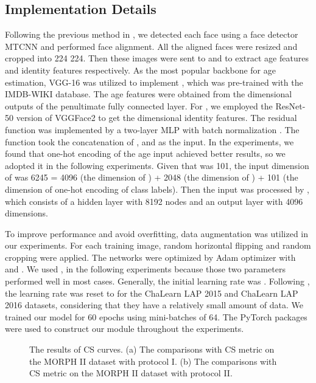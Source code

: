 \documentclass[journal,twoside]{IEEEtran}
\begin{document}
\subsection{Implementation Details}
Following the previous method in \cite{li2019bridgenet}, we detected each face using a face detector MTCNN \cite{zhang2016joint} and performed face alignment.  All the aligned faces were resized and cropped into 224  224. Then these images were sent to  and  to extract age features and identity features respectively. As the most popular backbone \cite{li2019bridgenet,pan2018mean,shen2018deep,rothe2018deep} for age estimation, VGG-16 was utilized to implement , which was pre-trained with the IMDB-WIKI database. The age features were obtained from the  dimensional outputs of the penultimate fully connected layer. For , we employed the ResNet-50 version of VGGFace2 \cite{cao2018vggface2} to get the  dimensional identity features. The residual function  was implemented by a two-layer MLP with batch normalization \cite{pmlr-v37-ioffe15}. The function  took the concatenation of ,  and  as the input. In the experiments, we found that one-hot encoding of the age input achieved better results, so we adopted it in the following experiments. Given that  was 101, the input dimension of  was 6245 = 4096 (the dimension of ) + 2048 (the dimension of ) + 101 (the dimension of one-hot encoding of class labels). Then the input was processed by , which consists of a hidden layer with 8192 nodes and an output layer with 4096 dimensions.



To improve performance and avoid overfitting, data augmentation was utilized in our experiments. For each training image, random horizontal flipping and random cropping were applied.
The networks were optimized by Adam optimizer \cite{kingma2015adam} with  and . We used ,  in the following experiments because those two parameters performed well in most cases. Generally, the initial learning rate was . Following \cite{li2019bridgenet}, the learning rate was reset to  for the ChaLearn LAP 2015 and  ChaLearn LAP 2016 datasets, considering that they have a relatively small amount of data. We trained our model for 60 epochs using mini-batches of 64.
The PyTorch \cite{Paszke2019PyTorch} packages were used to construct our module throughout the experiments.

\begin{figure*}[t]
  \centering
  \caption{The results of CS curves. (a) The comparisons with CS metric on the MORPH II dataset with
  protocol I. (b) The comparisons with CS metric on the MORPH II dataset with
  protocol II.}
  \label{fig:cs}
\end{figure*}
\end{document}
